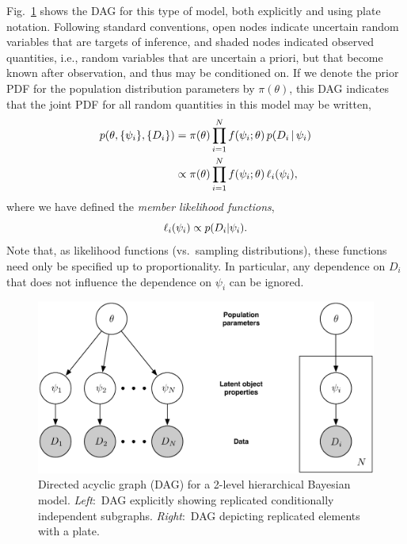 Fig.~\ref{fig:DAG-2Level} shows the DAG for this type of model, both explicitly and using plate notation.  Following standard conventions, open nodes indicate uncertain random variables that are targets of inference, and shaded nodes indicated observed quantities, i.e., random variables that are uncertain a priori, but that become known after observation, and thus may be conditioned on.
If we denote the prior PDF for the population distribution parameters by $\pi(\theta)$, this DAG indicates that the joint PDF for all random quantities in this model may be written,
\begin{align}
p(\theta, \{\psi_i\}, \{D_i\})
  &= \pi(\theta) \prod_{i=1}^N f(\psi_i;\theta)\, p(D_i \,|\, \psi_i)\\
  &\propto \pi(\theta) \prod_{i=1}^N f(\psi_i;\theta)\, \ell_i(\psi_i),
\label{joint-2level}
\end{align}
where we have defined the \emph{member likelihood functions},
\[
\ell_i(\psi_i) \propto p(D_i|\psi_i).
\label{mlike-def}
\]
Note that, as likelihood functions (vs.\ sampling distributions), these functions need only be specified up to proportionality.
In particular, any dependence on $D_i$ that does not influence the dependence on $\psi_i$ can be ignored.

\begin{figure}
\begin{center}
\includegraphics[width=.8\textwidth]{fig/DAG-2Level-Full+Plate}
\end{center}
\caption{Directed acyclic graph (DAG) for a 2-level hierarchical Bayesian model.
\emph{Left}:~DAG explicitly showing replicated conditionally independent subgraphs.
\emph{Right}:~DAG depicting replicated elements with a plate.}
\label{fig:DAG-2Level}
\end{figure}


